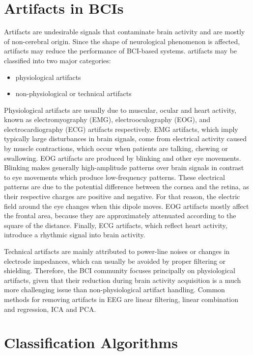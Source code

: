 \section {Artifacts in BCIs}

Artifacts are undesirable signals that contaminate brain activity and are mostly of non-cerebral origin. Since the shape of neurological phenomenon is affected, artifacts may reduce the performance of BCI-based systems. artifacts may be classified into two major categories:

\begin{itemize}
 \item physiological artifacts
 \item non-physiological or technical artifacts
 \end{itemize}

Physiological artifacts are usually due to muscular, ocular and heart activity, known as electromyography (EMG), electrooculography (EOG), and electrocardiography (ECG) artifacts respectively. EMG artifacts, which imply typically large disturbances in brain signals, come from electrical activity caused by muscle contractions, which occur when patients are talking, chewing or swallowing. EOG artifacts are produced by blinking and other eye movements. Blinking makes generally high-amplitude patterns over brain signals in contrast to eye movements which produce low-frequency patterns. These electrical patterns are due to the potential difference between the cornea and the retina, as their respective charges are positive and negative. For that reason, the electric field around the eye changes when this dipole moves. EOG artifacts mostly affect the frontal area, because they are approximately attenuated according to the square of the distance. Finally, ECG artifacts, which reflect heart activity, introduce a rhythmic signal into brain activity.

Technical artifacts are mainly attributed to power-line noises or changes in electrode impedances, which can usually be avoided by proper filtering or shielding. Therefore, the BCI community focuses principally on physiological artifacts, given that their reduction during brain activity acquisition is a much more challenging issue than non-physiological artifact handling. Common methods for removing artifacts in EEG are linear filtering, linear combination and regression, ICA and PCA.

\section{Classification Algorithms}

